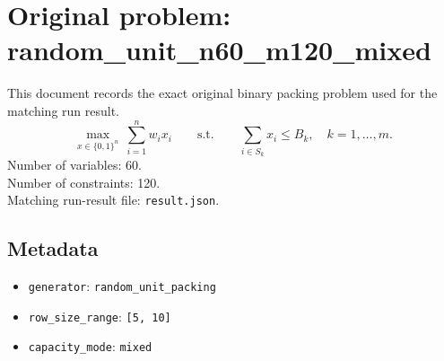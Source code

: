 \documentclass[11pt]{article}
\begin{document}
\section*{Original problem: random\_unit\_n60\_m120\_mixed}
This document records the exact original binary packing problem used for the matching run result.
\[
\max_{x\in\{0,1\}^n}\ \sum_{i=1}^n w_i x_i
\qquad\text{s.t.}\qquad
\sum_{i\in S_k} x_i \le B_k,\quad k=1,\dots,m.
\]
Number of variables: 60.\\
Number of constraints: 120.\\
Matching run-result file: \texttt{result.json}.
\subsection*{Metadata}
\begin{itemize}
\item \texttt{generator}: \texttt{random\_unit\_packing}
\item \texttt{row\_size\_range}: \texttt{[5, 10]}
\item \texttt{capacity\_mode}: \texttt{mixed}
\end{itemize}
\end{document}

